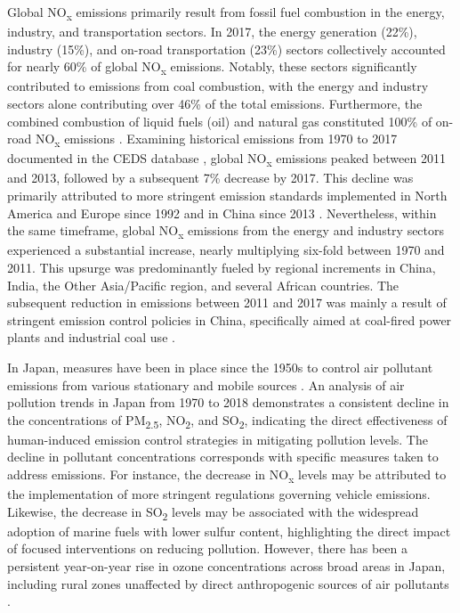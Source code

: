 Global NO\textsubscript{x} emissions primarily result from fossil fuel combustion in the energy, industry, and transportation sectors. In 2017, the energy generation (22\%), industry (15\%), and on-road transportation (23\%) sectors collectively accounted for nearly 60\% of global NO\textsubscript{x} emissions. Notably, these sectors significantly contributed to emissions from coal combustion, with the energy and industry sectors alone contributing over 46\% of the total emissions. Furthermore, the combined combustion of liquid fuels (oil) and natural gas constituted 100\% of on-road NO\textsubscript{x} emissions \citep{mcduffie2020global}. Examining historical emissions from 1970 to 2017 documented in the CEDS database \citep{mcduffie2020global}, global NO\textsubscript{x} emissions peaked between 2011 and 2013, followed by a subsequent 7\% decrease by 2017. This decline was primarily attributed to more stringent emission standards implemented in North America and Europe since 1992 and in China since 2013 \citep{mcduffie2020global, zheng2018trends}. Nevertheless, within the same timeframe, global NO\textsubscript{x} emissions from the energy and industry sectors experienced a substantial increase, nearly multiplying six-fold between 1970 and 2011. This upsurge was predominantly fueled by regional increments in China, India, the Other Asia/Pacific region, and several African countries. The subsequent reduction in emissions between 2011 and 2017 was mainly a result of stringent emission control policies in China, specifically aimed at coal-fired power plants and industrial coal use \citep{zheng2018trends, liu2015reduced}. \par


In Japan, measures have been in place since the 1950s to control air pollutant emissions from various stationary and mobile sources \citep{ito202130}. An analysis of air pollution trends in Japan from 1970 to 2018 \citep{ito202130, kannari2013thirty, wakamatsu2013air} demonstrates a consistent decline in the concentrations of PM\textsubscript{2.5}, NO\textsubscript{2}, and SO\textsubscript{2}, indicating the direct effectiveness of human-induced emission control strategies in mitigating pollution levels. The decline in pollutant concentrations corresponds with specific measures taken to address emissions. For instance, the decrease in NO\textsubscript{x} levels may be attributed to the implementation of more stringent regulations governing vehicle emissions. Likewise, the decrease in SO\textsubscript{2} levels may be associated with the widespread adoption of marine fuels with lower sulfur content, highlighting the direct impact of focused interventions on reducing pollution. However, there has been a persistent year-on-year rise in ozone concentrations across broad areas in Japan, including rural zones unaffected by direct anthropogenic sources of air pollutants \citep{ito202130}. \par

